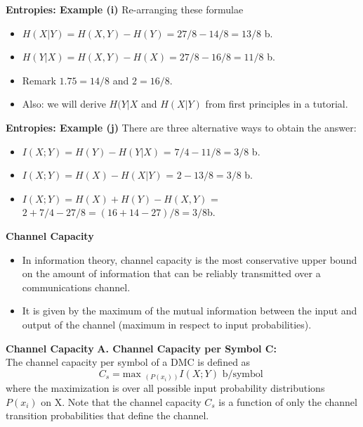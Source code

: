 \documentclass[a4]{beamer}
\begin{document}


\noindent \textbf{Entropies: Example (i)}
Re-arranging these formulae
\begin{itemize}
\item $H(X|Y) = H(X,Y)-H(Y) = 27/8 - 14/8 = 13/8$ b. \bigskip
\item $H(Y|X) = H(X,Y)-H(X) = 27/8 - 16/8 = 11/8$ b.
\end{itemize}
\bigskip
\begin{itemize}
\item Remark $1.75 =14/8$ and $2 = 16/8$.\\\bigskip
\item Also: we will derive $H(Y|X$ and $H(X|Y)$ from first principles in a tutorial.
\end{itemize}



\noindent \textbf{Entropies: Example (j)}
There are three alternative ways to obtain the answer:
\begin{itemize}
\item $I(X; Y ) = H(Y ) - H(Y |X)$ = $7/4 - 11/8 = 3/8$ b.
\item $I(X; Y ) = H(X) - H(X|Y)$ = $2 - 13/8 = 3/8$ b.
\item $I(X; Y ) = H(X) + H(Y ) - H(X,Y )$ = $2 + 7/4 - 27/8 = (16+14-27)/8 = 3/8$b.
\end{itemize}



\noindent \textbf{Channel Capacity}
\begin{itemize} \item
In information theory, channel capacity is the most conservative upper bound on the amount of information that can be reliably transmitted over a communications channel. \item  It is given by the maximum of the mutual information between the input and output of the channel (maximum in respect to input probabilities).
\end{itemize}



\noindent \textbf{Channel Capacity}
\textbf{A. Channel Capacity per Symbol C:}\\
The channel capacity per symbol of a DMC is defined as
\[
C_s = \mbox{max }_{(P(x_i))}I(X; Y) \mbox{ b/symbol }
\]
where the maximization is over all possible input probability distributions $P(x_i)$ on X. Note that the
channel capacity $C_s$ is a function of only the channel transition probabilities that define the channel.
\end{document}
